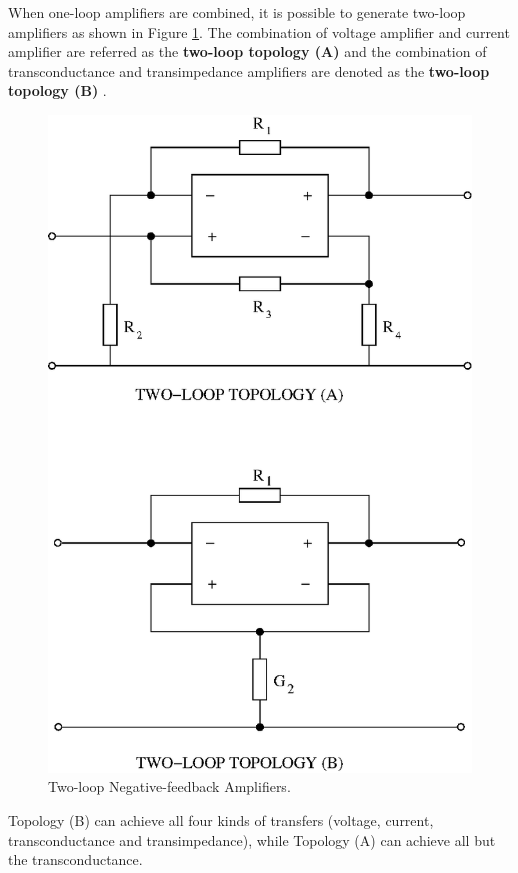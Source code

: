 \documentclass[conference]{IEEEtran}
\begin{document}
When one-loop amplifiers are combined, it is possible to generate two-loop amplifiers as shown in Figure \ref{fig:two_loop}. The combination of voltage amplifier and current amplifier are referred as the {\bf two-loop topology (A)} and the combination of transconductance and transimpedance amplifiers are denoted as the {\bf two-loop topology (B)} \cite{nordholt,stoffels}.

\begin{figure}[hbtp]
	\centering
	\includegraphics[scale=.5]{figures/basic_two_loops.eps}
	\caption{Two-loop Negative-feedback Amplifiers.}
	\label{fig:two_loop}
\end{figure}

Topology (B) can achieve all four kinds of transfers (voltage, current, transconductance and transimpedance), while Topology (A) can achieve all but the transconductance.
\end{document}
